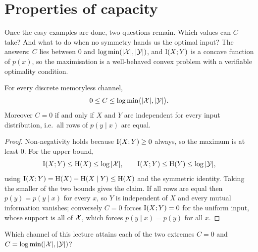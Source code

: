 \section{Properties of capacity}\label{sec:properties}
\quad{}

\begin{strand}
Once the easy examples are done, two questions remain. Which values can $C$
take? And what to do when no symmetry hands us the optimal input? The answers:
$C$ lies between $0$ and $\log\min(|\mathcal{X}|,|\mathcal{Y}|)$, and $\mathrm{I}(X;Y)$ is a concave
function of $p(x)$, so the maximisation is a well-behaved convex problem with a
verifiable optimality condition.
\end{strand}



\begin{proposition}\label{prop:capacity-bounds}
For every discrete memoryless channel,
\[
  0\le C\le\log\min\bigl(|\mathcal{X}|,|\mathcal{Y}|\bigr).
\]
Moreover $C=0$ if and only if $X$ and $Y$ are independent for every input
distribution, i.e.\ all rows of $p(y\mid x)$ are equal.
\end{proposition}

\begin{proof}
Non-negativity holds because $\mathrm{I}(X;Y)\ge0$ always, so the maximum is at least
$0$. For the upper bound,
\[
  \mathrm{I}(X;Y)\le\mathrm{H}(X)\le\log|\mathcal{X}|,
  \qquad
  \mathrm{I}(X;Y)\le\mathrm{H}(Y)\le\log|\mathcal{Y}|,
\]
using $\mathrm{I}(X;Y)=\mathrm{H}(X)-\mathrm{H}(X\mid Y)\le\mathrm{H}(X)$ and the symmetric identity.
Taking the smaller of the two bounds gives the claim. If all rows are equal then
$p(y)=p(y\mid x)$ for every $x$, so $Y$ is independent of $X$ and every mutual
information vanishes; conversely $C=0$ forces $\mathrm{I}(X;Y)=0$ for the uniform
input, whose support is all of $\mathcal{X}$, which forces $p(y\mid x)=p(y)$ for all $x$.
\end{proof}

\begin{yourturn}
Which channel of this lecture attains each of the two extremes
$C=0$ and $C=\log\min(|\mathcal{X}|,|\mathcal{Y}|)$?
\ifshowanswers\else\workspace[2]\fi
{}
\end{yourturn}

